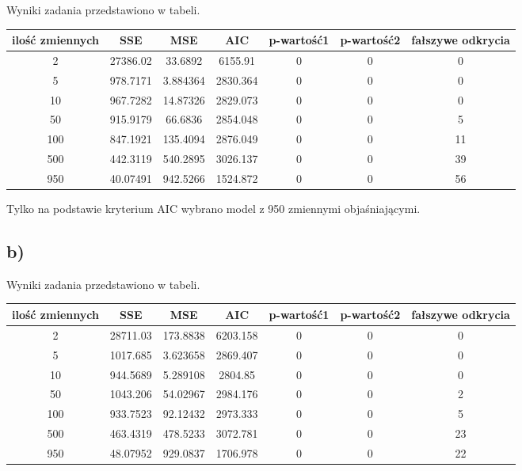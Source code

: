 \documentclass[9pt]{article}  %
\begin{document}
    Wyniki zadania przedstawiono w tabeli.
      \begin{table}[H]
  \centering
    \begin{tabular}{c|c|c|c|c|c|c}
     ilość zmiennych & SSE & MSE & AIC & p-wartość1 & p-wartość2 & fałszywe odkrycia \\ \hline
    2 & 27386.02 & 33.6892 & 6155.91 & 0 & 0  & 0 \\
    5 & 978.7171 & 3.884364 & 2830.364 & 0 & 0 & 0 \\
    10 & 967.7282 & 14.87326 & 2829.073 & 0 & 0 & 0 \\
    50 & 915.9179 & 66.6836 & 2854.048 & 0 & 0 & 5 \\
    100 & 847.1921 & 135.4094 & 2876.049 & 0 & 0 & 11 \\
    500 & 442.3119 & 540.2895 & 3026.137 & 0 & 0 & 39 \\
    950 & 40.07491 & 942.5266 & 1524.872 & 0 & 0 & 56 \\
  \end{tabular} 
  \end{table}
  Tylko na podstawie kryterium AIC wybrano model z 950 zmiennymi objaśniającymi.
  
  \subsection{b)}
  
  Wyniki zadania przedstawiono w tabeli.
        \begin{table}[H]
  \centering
    \begin{tabular}{c|c|c|c|c|c|c}
     ilość zmiennych & SSE & MSE & AIC & p-wartość1 & p-wartość2 & fałszywe odkrycia \\ \hline
    2 & 28711.03 & 173.8838 & 6203.158 & 0 & 0  & 0 \\
    5 & 1017.685 & 3.623658 & 2869.407 & 0 & 0 & 0 \\
    10 & 944.5689 & 5.289108 & 2804.85 & 0 & 0 & 0 \\
    50 & 1043.206 & 54.02967 & 2984.176 & 0 & 0 & 2 \\
    100 & 933.7523 & 92.12432 & 2973.333 & 0 & 0 & 5 \\
    500 & 463.4319 & 478.5233 & 3072.781 & 0 & 0 & 23 \\
    950 & 48.07952 & 929.0837 & 1706.978 & 0 & 0 & 22 \\
  \end{tabular} 
  \end{table}
  
\end{document}

